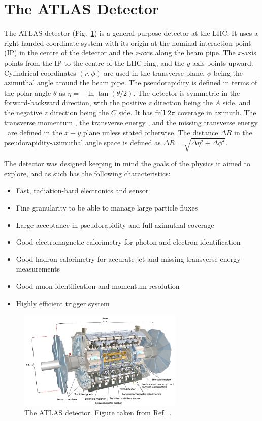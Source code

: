 \section{The ATLAS Detector}
The ATLAS detector (Fig.~\ref{fig:atlas}) is a general purpose detector at the LHC. It uses a right-handed coordinate system with its origin at the nominal interaction point (IP) in the
 centre of the detector and the $z$-axis along the beam pipe. The $x$-axis points from the IP to the centre of the LHC ring, and the $y$ axis points upward. Cylindrical coordinates 
 $(r,\phi)$ are used in the transverse plane, $\phi$ being the azimuthal angle around the beam pipe. The pseudorapidity is defined in terms of the polar angle $\theta$ as 
 $\eta=-\ln\tan(\theta/2)$. The detector is symmetric in the forward-backward direction, with the positive $z$ direction being the $A$ side, and the negative $z$ direction being the $C$ side. It has full $2\pi$ coverage in azimuth.  The transverse momentum \pt, the transverse energy \Et, and the missing transverse energy \Etmiss\ are defined in the $x-y$ plane unless stated otherwise. The distance $\Delta R$ in the pseudorapidity-azimuthal angle space is defined as $\Delta R = \sqrt{\Delta \eta^2 + \Delta \phi^2}$.

The detector was designed keeping in mind the goals of the physics it aimed to explore, and as such has the following characteristics:
\begin{itemize}
\item Fast, radiation-hard electronics and sensor
\item Fine granularity to be able to manage large particle fluxes
\item Large acceptance in pseudorapidity and full azimuthal coverage
\item Good electromagnetic calorimetry for photon and electron identification
\item Good hadron calorimetry for accurate jet and missing transverse energy measurements
\item Good muon identification and momentum resolution
\item Highly efficient trigger system 
\end{itemize}

\begin{figure}[ht]
	\centering
	\includegraphics[width=0.7\textwidth]{figures/setup/atlas.pdf}
	\caption{The ATLAS detector. Figure taken from Ref.~\cite{Aad:2008zzm}.}	
	\label{fig:atlas}
\end{figure}



